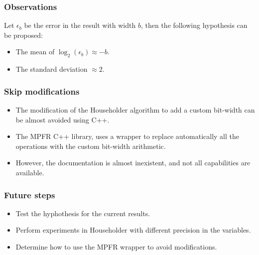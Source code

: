 \documentclass[serif, 12pt]{beamer}
\begin{document}

\begin{frame}
\frametitle{Observations}
Let $\epsilon_b$ be the error in the result with width $b$, then the following 
hypothesis can be proposed:
\begin{itemize}
\item The mean of $\log_2(\epsilon_b) \approx -b$.
\item The standard deviation $\approx 2$.
\end{itemize}

\end{frame}


\begin{frame}
\frametitle{Skip modifications}

\begin{itemize}
\item The modification of the Householder algorithm to add a custom bit-width 
can be almost avoided using C++.

\item The MPFR C++ library, uses a wrapper to replace automatically all the 
operations with the custom bit-width arithmetic.

\item However, the documentation is almost inexistent, and not all capabilities 
are available.
\end{itemize}
\end{frame}


\begin{frame}
\frametitle{Future steps}

\begin{itemize}
\item Test the hyphothesis for the current results.
\item Perform experiments in Householder with different precision in the 
variables.
\item Determine how to use the MPFR wrapper to avoid modifications.
\end{itemize}

\end{frame}

\end{document}
